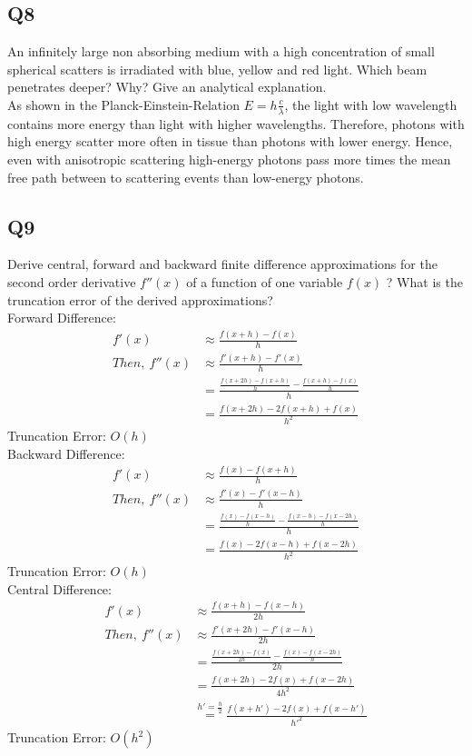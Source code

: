 \subsection*{Q8}
An infinitely large non absorbing medium with a high concentration of small spherical scatters is irradiated with blue, yellow and red light. Which beam penetrates deeper? Why? Give an analytical explanation.
\\[2\baselineskip]
As shown in the Planck-Einstein-Relation $E=h\frac{c}{\lambda}$, the light with low wavelength contains more energy than light with higher wavelengths. Therefore, photons with high energy scatter more often in tissue than photons with lower energy. Hence, even with anisotropic scattering high-energy photons pass more times the mean free path between to scattering events than low-energy photons.


\subsection*{Q9}
Derive central, forward and backward finite difference approximations for the second order derivative $f''(x)$ of a function of one variable $f(x)$ ?
What is the truncation error of the derived approximations?\\
Forward Difference:\\
\begin{align}
    f'(x) &\approx \frac{f(x+h) -f(x)}{h}\\
    Then,\    f''(x) &\approx \frac{f'(x+h)-f'(x)}{h}\\
    &=\frac{\frac{f(x+2h)-f(x+h)}{h}-\frac{f(x+h)-f(x)}{h}}{h}\\
    &=\frac{f(x+2h)-2f(x+h)+f(x)}{h^2}
\end{align}
Truncation Error: $O(h)$\\
Backward Difference:\\
\begin{align}
    f'(x) &\approx \frac{f(x) -f(x+h)}{h}\\
    Then,\    f''(x) &\approx \frac{f'(x)-f'(x-h)}{h}\\
    &=\frac{\frac{f(x)-f(x-h)}{h}-\frac{f(x-h)-f(x-2h)}{h}}{h}\\
    &=\frac{f(x)-2f(x-h)+f(x-2h)}{h^2}
\end{align}
Truncation Error: $O(h)$\\

Central Difference:\\
\begin{align}
    f'(x) &\approx \frac{f(x+h) -f(x-h)}{2h}\\
    Then,\    f''(x) &\approx \frac{f'(x+2h)-f'(x-h)}{2h}\\
    &=\frac{\frac{f(x+2h)-f(x)}{2h}-\frac{f(x)-f(x-2h)}{h}}{2h}\\
    &=\frac{f(x+2h)-2f(x)+f(x-2h)}{4h^2}\\
    &\overset{h' = \frac{h}{2}}{=}\frac{f(x+h')-2f(x)+f(x-h')}{h'^2} \label{eq:2nd_central}
\end{align}
Truncation Error: $O(h^2)$



